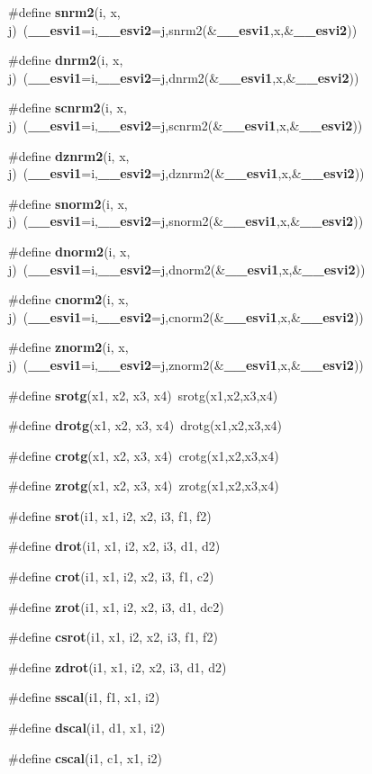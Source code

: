 \begin{CompactItemize}
\#define {\bf snrm2}(i, x, j)~({\bf \_\-\_\-esvi1}=i,{\bf \_\-\_\-esvi2}=j,snrm2(\&{\bf \_\-\_\-esvi1},x,\&{\bf \_\-\_\-esvi2}))
\item 
\#define {\bf dnrm2}(i, x, j)~({\bf \_\-\_\-esvi1}=i,{\bf \_\-\_\-esvi2}=j,dnrm2(\&{\bf \_\-\_\-esvi1},x,\&{\bf \_\-\_\-esvi2}))
\item 
\#define {\bf scnrm2}(i, x, j)~({\bf \_\-\_\-esvi1}=i,{\bf \_\-\_\-esvi2}=j,scnrm2(\&{\bf \_\-\_\-esvi1},x,\&{\bf \_\-\_\-esvi2}))
\item 
\#define {\bf dznrm2}(i, x, j)~({\bf \_\-\_\-esvi1}=i,{\bf \_\-\_\-esvi2}=j,dznrm2(\&{\bf \_\-\_\-esvi1},x,\&{\bf \_\-\_\-esvi2}))
\item 
\#define {\bf snorm2}(i, x, j)~({\bf \_\-\_\-esvi1}=i,{\bf \_\-\_\-esvi2}=j,snorm2(\&{\bf \_\-\_\-esvi1},x,\&{\bf \_\-\_\-esvi2}))
\item 
\#define {\bf dnorm2}(i, x, j)~({\bf \_\-\_\-esvi1}=i,{\bf \_\-\_\-esvi2}=j,dnorm2(\&{\bf \_\-\_\-esvi1},x,\&{\bf \_\-\_\-esvi2}))
\item 
\#define {\bf cnorm2}(i, x, j)~({\bf \_\-\_\-esvi1}=i,{\bf \_\-\_\-esvi2}=j,cnorm2(\&{\bf \_\-\_\-esvi1},x,\&{\bf \_\-\_\-esvi2}))
\item 
\#define {\bf znorm2}(i, x, j)~({\bf \_\-\_\-esvi1}=i,{\bf \_\-\_\-esvi2}=j,znorm2(\&{\bf \_\-\_\-esvi1},x,\&{\bf \_\-\_\-esvi2}))
\item 
\#define {\bf srotg}(x1, x2, x3, x4)~srotg(x1,x2,x3,x4)
\item 
\#define {\bf drotg}(x1, x2, x3, x4)~drotg(x1,x2,x3,x4)
\item 
\#define {\bf crotg}(x1, x2, x3, x4)~crotg(x1,x2,x3,x4)
\item 
\#define {\bf zrotg}(x1, x2, x3, x4)~zrotg(x1,x2,x3,x4)
\item 
\#define {\bf srot}(i1, x1, i2, x2, i3, f1, f2)
\item 
\#define {\bf drot}(i1, x1, i2, x2, i3, d1, d2)
\item 
\#define {\bf crot}(i1, x1, i2, x2, i3, f1, c2)
\item 
\#define {\bf zrot}(i1, x1, i2, x2, i3, d1, dc2)
\item 
\#define {\bf csrot}(i1, x1, i2, x2, i3, f1, f2)
\item 
\#define {\bf zdrot}(i1, x1, i2, x2, i3, d1, d2)
\item 
\#define {\bf sscal}(i1, f1, x1, i2)
\item 
\#define {\bf dscal}(i1, d1, x1, i2)
\item 
\#define {\bf cscal}(i1, c1, x1, i2)

\end{CompactItemize}
